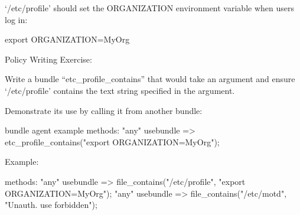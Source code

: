 \begin{aside}
\label{aside:exercise_35}

\end{aside}





\begin{aside}
\label{aside:exercise_36}

`/etc/profile' should set the ORGANIZATION environment variable when users log in:

\begin{code}
export ORGANIZATION=MyOrg
\end{code}

Policy Writing Exercise:

Write a bundle ``etc\_profile\_contains'' that would take an argument and ensure `/etc/profile' contains the text string specified in the argument.

Demonstrate its use by calling it from another bundle:

\begin{code}
    bundle agent example {
       methods:
         "any"
             usebundle => etc_profile_contains("export ORGANIZATION=MyOrg");
    }
\end{code}

\end{aside}





\begin{aside}
\label{aside:exercise_37}

Example:

\begin{code}
    methods:
     "any" usebundle => file_contains("/etc/profile", "export ORGANIZATION=MyOrg");
     "any" usebundle => file_contains("/etc/motd", "Unauth. use forbidden");
\end{code}

\end{aside}





